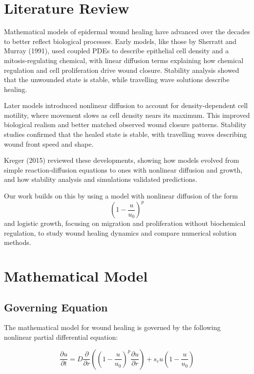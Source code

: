 \documentclass[conference]{IEEEtran}
\begin{document}
\section{Literature Review} 
Mathematical models of epidermal wound healing have advanced over the decades to better reflect biological processes. Early models, like those by Sherratt and Murray (1991), used coupled PDEs to describe epithelial cell density and a mitosis-regulating chemical, with linear diffusion terms explaining how chemical regulation and cell proliferation drive wound closure. Stability analysis showed that the unwounded state is stable, while travelling wave solutions describe healing.

Later models introduced nonlinear diffusion to account for density-dependent cell motility, where movement slows as cell density nears its maximum. This improved biological realism and better matched observed wound closure patterns. Stability studies confirmed that the healed state is stable, with travelling waves describing wound front speed and shape.

Kreger (2015) reviewed these developments, showing how models evolved from simple reaction-diffusion equations to ones with nonlinear diffusion and growth, and how stability analysis and simulations validated predictions.

Our work builds on this by using a model with nonlinear diffusion of the form 
\[
\left( 1 - \frac{u}{u_0} \right)^p
\]
and logistic growth, focusing on migration and proliferation without biochemical regulation, to study wound healing dynamics and compare numerical solution methods.


\section{Mathematical Model}

\subsection{Governing Equation}

The mathematical model for wound healing is governed by the following nonlinear partial differential equation:

\begin{equation}
\frac{\partial u}{\partial t} = D \frac{\partial}{\partial r} \left( \left(1 - \frac{u}{u_0}\right)^p \frac{\partial u}{\partial r} \right) + s_c u \left(1 - \frac{u}{u_0}\right)
\label{eq:main_pde}
\end{equation}
\end{document}
